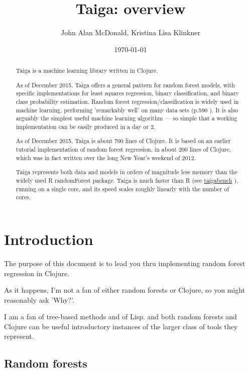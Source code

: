 \documentclass[10pt,openany]{article}
\title{Taiga: overview}
\author{John Alan McDonald, Kristina Lisa Klinkner}
\date{\today}
\numberwithin{definition}{section}
\numberwithin{example}{section}
\numberwithin{equation}{section}
\numberwithin{figure}{section}
\begin{document}
\maketitle
\begin{abstract}
Taiga is a machine learning library written in Clojure. 

As of December 2015, Taiga offers a general
pattern for random forest models, with specific implementations for least 
squares regression, binary classification, and binary class probability 
estimation. 
Random forest regression/classification is widely used in machine learning, 
performing 'remarkably well' on many data sets 
(p.590 \cite{hastie-tibshirani-friedman-2009}).
It is also arguably the simplest useful machine learning algorithm
--- so simple that a working implementation can be easily produced
in a day or 2. 

As of December 2015, Taiga is about 700 lines of Clojure.
It is based on an earlier tutorial implementation of random forest
regression, in about 200 lines of Clojure, which was in fact written
over the long New Year's weekend of 2012.

Taiga represents both data and models in orders of
magnitude less memory than the widely used R
randomForest \cite{r-randomForest} package.
Taiga is much faster than R 
(see
\href{https://github.com/wahpenayo/taigabench}{taigabench} \cite{taigabench-2018}), 
running on a single core, and its speed scales roughly linearly with the
number of cores.
\end{abstract}
\newpage{}

\tableofcontents{}
\newpage{}


\section{Introduction}

The purpose of this document is to lead you thru implementing random
forest regression in Clojure. 

As it happens, I'm not a fan of either random forests or Clojure,
so you might reasonably ask 'Why?'. 

I am a fan of tree-based methods and of Lisp. and both random forests
and Clojure can be useful introductory instances of the larger class
of tools they represent. 


\subsection{Random forests}
\end{document}
